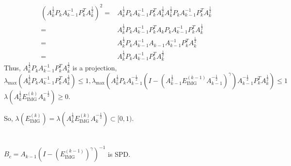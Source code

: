 \documentclass{article}
\begin{document}
\begin{equation*}
    \begin{aligned}
        (A_k^{\frac{1}{2}}P_kA_{k-1}^{-1}P_k^TA_{k}^{\frac{1}{2}})^2= & A_k^{\frac{1}{2}}P_kA_{k-1}^{-1}P_k^TA_{k}^{\frac{1}{2}}A_k^{\frac{1}{2}}P_kA_{k-1}^{-1}P_k^TA_{k}^{\frac{1}{2}} \\
        =                                                             & A_k^{\frac{1}{2}}P_kA_{k-1}^{-1}P_k^TA_{k}P_kA_{k-1}^{-1}P_k^TA_{k}^{\frac{1}{2}}                                \\
        =                                                             & A_k^{\frac{1}{2}}P_kA_{k-1}^{-1}A_{k-1}A_{k-1}^{-1}P_k^TA_{k}^{\frac{1}{2}}                                      \\
        =                                                             & A_k^{\frac{1}{2}}P_kA_{k-1}^{-1}P_k^TA_{k}^{\frac{1}{2}}
    \end{aligned}
\end{equation*}
Thus, $A_k^{\frac{1}{2}}P_kA_{k-1}^{-1}P_k^TA_{k}^{\frac{1}{2}}$ is a projection, $\lambda_{\max}(A_k^{\frac{1}{2}}P_kA_{k-1}^{-1}P_k^TA_{k}^{\frac{1}{2}})\leqslant 1,   \lambda_{\max} (A_k^{\frac{1}{2}}P_kA_{k-1}^{-\frac{1}{2}}(I-(A_{k-1}^{\frac{1}{2}}E_\text{IMG}^{(k-1)}A_{k-1}^{-\frac{1}{2}})^\gamma)A_{k-1}^{-\frac{1}{2}}P_k^TA_k^{\frac{1}{2}})\leqslant 1$
$\lambda(A_k^{\frac{1}{2}}E_\text{IMG}^{(k)}A_k^{-\frac{1}{2}})\geqslant 0$.

So, $\lambda(E_\text{IMG}^{(k)})=\lambda(A_k^{\frac{1}{2}}E_\text{IMG}^{(k)}A_k^{-\frac{1}{2}})\subset[0,1).$

\section{}
$B_c=A_{k-1}(I-(E_\text{IMG}^{(k-1)})^\gamma)^{-1}$ is SPD.
\end{document}
